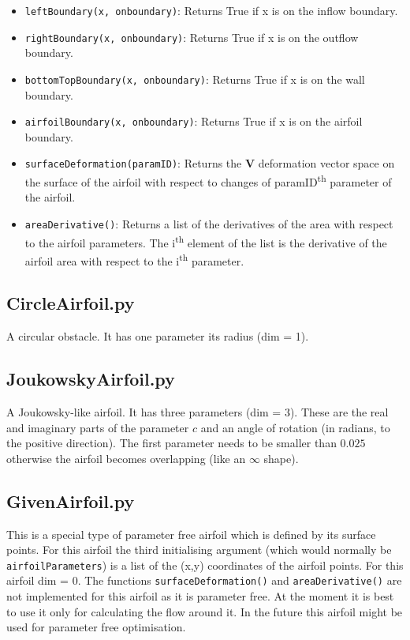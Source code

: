 \documentclass[12pt, a4paper]{article}
\begin{document}
            \begin{itemize}
                \item \texttt{leftBoundary(x, on\textunderscore boundary)}: Returns True if x is on the inflow boundary.
                \item \texttt{rightBoundary(x, on\textunderscore boundary)}: Returns True if x is on the outflow boundary.
                \item \texttt{bottomTopBoundary(x, on\textunderscore boundary)}: Returns True if x is on the wall boundary.
                \item \texttt{airfoilBoundary(x, on\textunderscore boundary)}: Returns True if x is on the airfoil boundary.
                \item \texttt{surfaceDeformation(paramID)}: Returns the $\mathbf{V}$ deformation vector space on the surface of the airfoil with respect to changes of paramID\textsuperscript{th} parameter of the airfoil.
                \item \texttt{areaDerivative()}: Returns a list of the derivatives of the area with respect to the airfoil parameters. The i\textsuperscript{th} element of the list is the derivative of the airfoil area with respect to the i\textsuperscript{th} parameter.
            \end{itemize}
        \subsection{CircleAirfoil.py}
            A circular obstacle. It has one parameter its radius (dim = 1).
        \subsection{JoukowskyAirfoil.py}
            A Joukowsky-like airfoil. It has three parameters (dim = 3). These are the real and imaginary parts of the parameter $c$ and an angle of rotation (in radians, to the positive direction). The first parameter needs to be smaller than $0.025$ otherwise the airfoil becomes overlapping (like an $\infty$ shape).
        \subsection{GivenAirfoil.py}
            This is a special type of parameter free airfoil which is defined by its surface points. For this airfoil the third initialising argument (which would normally be \texttt{airfoilParameters}) is a list of the (x,y) coordinates of the airfoil points. For this airfoil dim = 0. The functions \texttt{surfaceDeformation()} and \texttt{areaDerivative()} are not implemented for this airfoil as it is parameter free. At the moment it is best to use it only for calculating the flow around it. In the future this airfoil might be used for parameter free optimisation.
\end{document}
